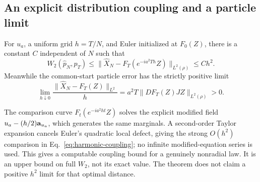 \subsection{An explicit distribution coupling and a particle limit}

\begin{theorem}
\label{thm:harmonic-coupling}
For $u_a$, a uniform grid $h=T/N$, and Euler initialized at $F_0(Z)$,
there is a constant $C$ independent of $N$ such that
\begin{equation}
 W_2(\widehat p_N,p_T)
 \le \|\widehat X_N-F_T(e^{-ia^2Th}Z)\|_{L^2(\rho)}
 \le Ch^2.
 \label{eq:harmonic-coupling}
\end{equation}
Meanwhile the common-start particle error has the strictly positive limit
\begin{equation}
 \lim_{h\downarrow0}\frac{\|\widehat X_N-F_T(Z)\|_{L^2}}h
 =a^2T\|DF_T(Z)JZ\|_{L^2(\rho)}>0.
 \label{eq:harmonic-particle-limit}
\end{equation}
\end{theorem}

The comparison curve $F_t(e^{-ia^2ht}Z)$ solves the explicit modified
field $u_a-(h/2)\mathbf a_{u_a}$, which generates the same marginals.
A second-order Taylor expansion cancels Euler's quadratic local defect,
giving the strong $O(h^2)$ comparison in
Eq.~\eqref{eq:harmonic-coupling}; no infinite modified-equation series is
used. This gives a computable coupling bound for a genuinely nonradial
law. It is an upper bound on full $W_2$, not its exact value. The theorem
does not claim a positive $h^2$ limit for that optimal distance.
